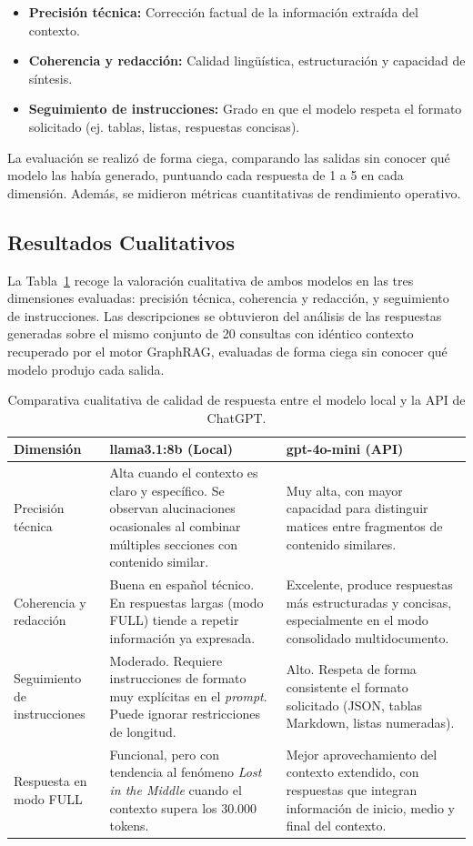 \begin{itemize}
    \item \textbf{Precisión técnica:} Corrección factual de la información extraída del contexto.
    \item \textbf{Coherencia y redacción:} Calidad lingüística, estructuración y capacidad de síntesis.
    \item \textbf{Seguimiento de instrucciones:} Grado en que el modelo respeta el formato solicitado (ej. tablas, listas, respuestas concisas).
\end{itemize}

La evaluación se realizó de forma ciega, comparando las salidas sin conocer qué modelo las había generado, puntuando cada respuesta de 1 a 5 en cada dimensión. Además, se midieron métricas cuantitativas de rendimiento operativo.

\subsection{Resultados Cualitativos}

La Tabla~\ref{tab:comparativa_modelos} recoge la valoración cualitativa de ambos modelos en las tres dimensiones evaluadas: precisión técnica, coherencia y redacción, y seguimiento de instrucciones. Las descripciones se obtuvieron del análisis de las respuestas generadas sobre el mismo conjunto de 20 consultas con idéntico contexto recuperado por el motor GraphRAG, evaluadas de forma ciega sin conocer qué modelo produjo cada salida.

\begin{table}[ht]
\centering
\begin{tabularx}{\textwidth}{|l|X|X|}
\hline
\textbf{Dimensión} & \textbf{llama3.1:8b (Local)} & \textbf{gpt-4o-mini (API)} \\ \hline
Precisión técnica & Alta cuando el contexto es claro y específico. Se observan alucinaciones ocasionales al combinar múltiples secciones con contenido similar. & Muy alta, con mayor capacidad para distinguir matices entre fragmentos de contenido similares. \\ \hline
Coherencia y redacción & Buena en español técnico. En respuestas largas (modo FULL) tiende a repetir información ya expresada. & Excelente, produce respuestas más estructuradas y concisas, especialmente en el modo consolidado multidocumento. \\ \hline
Seguimiento de instrucciones & Moderado. Requiere instrucciones de formato muy explícitas en el \textit{prompt}. Puede ignorar restricciones de longitud. & Alto. Respeta de forma consistente el formato solicitado (JSON, tablas Markdown, listas numeradas). \\ \hline
Respuesta en modo FULL & Funcional, pero con tendencia al fenómeno \textit{Lost in the Middle} cuando el contexto supera los 30.000 tokens. & Mejor aprovechamiento del contexto extendido, con respuestas que integran información de inicio, medio y final del contexto. \\ \hline
\end{tabularx}
\caption{Comparativa cualitativa de calidad de respuesta entre el modelo local y la API de ChatGPT.}
\label{tab:comparativa_modelos}
\end{table}

